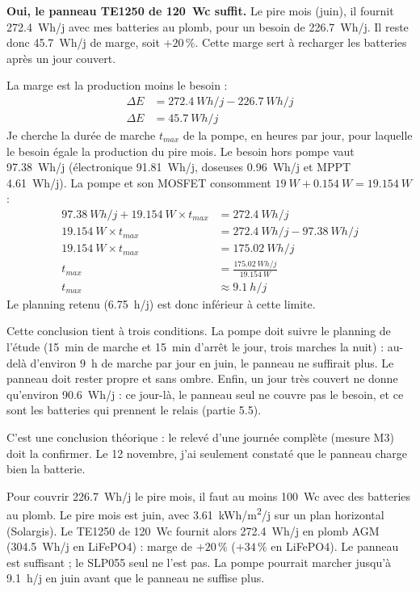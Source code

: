 \textbf{Oui, le panneau TE1250 de \qty{120}{Wc} suffit.} Le pire mois (juin), il fournit \qty{272,4}{Wh/j} avec mes batteries au plomb, pour un besoin de \qty{226,7}{Wh/j}. Il reste donc \qty{45,7}{Wh/j} de marge, soit $+20\,\%$. Cette marge sert à recharger les batteries après un jour couvert.

\begin{demonstration}
La marge est la production moins le besoin :
\begin{align*}
\Delta E &= \qty{272,4}{Wh/j} - \qty{226,7}{Wh/j}\\
\Delta E &= \qty{45,7}{Wh/j}
\end{align*}
Je cherche la durée de marche $t_{max}$ de la pompe, en heures par jour, pour laquelle le besoin égale la production du pire mois. Le besoin hors pompe vaut \qty{97,38}{Wh/j} (électronique \qty{91,81}{Wh/j}, doseuses \qty{0,96}{Wh/j} et MPPT \qty{4,61}{Wh/j}). La pompe et son MOSFET consomment $\qty{19}{W} + \qty{0,154}{W} = \qty{19,154}{W}$ :
\begin{align*}
\qty{97,38}{Wh/j} + \qty{19,154}{W} \times t_{max} &= \qty{272,4}{Wh/j}\\
\qty{19,154}{W} \times t_{max} &= \qty{272,4}{Wh/j} - \qty{97,38}{Wh/j}\\
\qty{19,154}{W} \times t_{max} &= \qty{175,02}{Wh/j}\\
t_{max} &= \frac{\qty{175,02}{Wh/j}}{\qty{19,154}{W}}\\
t_{max} &\approx \qty{9,1}{h/j}
\end{align*}
Le planning retenu (\qty{6,75}{h/j}) est donc inférieur à cette limite.
\end{demonstration}

Cette conclusion tient à trois conditions. La pompe doit suivre le planning de l'étude (\qty{15}{min} de marche et \qty{15}{min} d'arrêt le jour, trois marches la nuit) : au-delà d'environ \qty{9}{h} de marche par jour en juin, le panneau ne suffirait plus. Le panneau doit rester propre et sans ombre. Enfin, un jour très couvert ne donne qu'environ \qty{90,6}{Wh/j} : ce jour-là, le panneau seul ne couvre pas le besoin, et ce sont les batteries qui prennent le relais (partie 5.5).

C'est une conclusion théorique : le relevé d'une journée complète (mesure M3) doit la confirmer. Le 12 novembre, j'ai seulement constaté que le panneau charge bien la batterie.

\begin{aretenir}
Pour couvrir \qty{226,7}{Wh/j} le pire mois, il faut au moins \qty{100}{Wc} avec des batteries au plomb. Le pire mois est juin, avec \qty{3,61}{kWh/m^2/j} sur un plan horizontal (Solargis). Le TE1250 de \qty{120}{Wc} fournit alors \qty{272,4}{Wh/j} en plomb AGM (\qty{304,5}{Wh/j} en LiFePO4) : marge de $+20\,\%$ ($+34\,\%$ en LiFePO4). Le panneau est suffisant ; le SLP055 seul ne l'est pas. La pompe pourrait marcher jusqu'à \qty{9,1}{h/j} en juin avant que le panneau ne suffise plus.
\end{aretenir}
